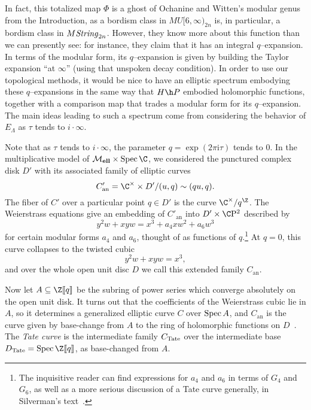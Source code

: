 In fact, this totalized map \(\Phi\) is a ghost of Ochanine and Witten's modular genus from the Introduction, as a bordism class in \(MU[6, \infty)_{2n}\) is, in particular, a bordism class in \(M\mathit{String}_{2n}\).  However, they know more about this function than we can presently see: for instance, they claim that it has an integral \(q\)--expansion.  In terms of the modular form, its \(q\)--expansion is given by building the Taylor expansion ``at \(\infty\)'' (using that unspoken decay condition).  In order to use our topological methods, it would be nice to have an elliptic spectrum embodying these \(q\)--expansions in the same way that \(H\h P\) embodied holomorphic functions, together with a comparison map that trades a modular form for its \(q\)--expansion.  The main ideas leading to such a spectrum come from considering the behavior of \(E_\Lambda\) as \(\tau\) tends to \(i \cdot \infty\).

\begin{definition}
Note that as \(\tau\) tends to \(i \cdot \infty\), the parameter \(q = \exp(2 \pi \mathrm i \tau)\) tends to \(0\).  In the multiplicative model of \(\moduli{ell} \times \Spec \C\), we considered the punctured complex disk \(D'\) with its associated family of elliptic curves \[C'_{\mathrm{an}} = \C^\times \times D' / (u, q) \sim (qu, q).\]  The fiber of \(C'\) over a particular point \(q \in D'\) is the curve \(\C^\times / q^{\Z}\). %
The Weierstrass equations give an embedding of \(C'_{\mathrm{an}}\) into \(D' \times \CP^2\) described by \[y^2 w + x y w = x^3 + a_4 x w^2 + a_6 w^3\] for certain modular forms \(a_4\) and \(a_6\), thought of as functions of \(q\).\footnote{The inquisitive reader can find expressions for \(a_4\) and \(a_6\) in terms of \(G_4\) and \(G_6\), as well as a more serious discussion of a Tate curve generally, in Silverman's text~\cite[Section VI.1]{SilvermanAdvanced}.}  At \(q = 0\), this curve collapses to the twisted cubic \[y^2 w + x y w = x^3,\] and over the whole open unit disc \(D\) we call this extended family \(C_{\mathrm{an}}\).

Now let \(A \subseteq \Z\ps{q}\) be the subring of power series which converge absolutely on the open unit disk.  It turns out that the coefficients of the Weierstrass cubic lie in \(A\), so it determines a generalized elliptic curve \(C\) over \(\operatorname{Spec} A\), and \(C_{\mathrm{an}}\) is the curve given by base-change from \(A\) to the ring of holomorphic functions on \(D\)~\cite[Section 5]{MoravaFormsOfKthy}.  The \textit{Tate curve} is the intermediate family \(C_{\mathrm{Tate}}\) over the intermediate base \(D_{\Tate} = \Spec \Z\ps{q}\), as base-changed from \(A\).
\end{definition}

